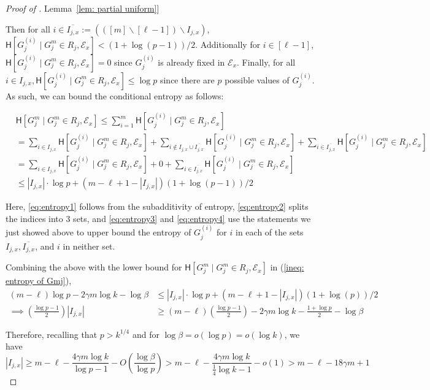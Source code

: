 \documentclass[11pt]{article}
\numberwithin{equation}{section}
\theoremstyle{definition}
\theoremstyle{plain}
\newcommand{\expref}[2]{\hyperref[#2]{#1~\ref{#2}}}
\newcommand{\cond}{\;|\;}
\newcommand{\bigo}[1]{\ensuremath{{{O} \left( {#1} \right)}}}
\newcommand{\littleo}[1]{\ensuremath{{o \left( {#1} \right)}}}
\newcommand{\eqdef}{\ensuremath{:=}}
\newcommand{\entropy}{\ensuremath{\mathsf{H}}}
\newcommand{\event}{\ensuremath{\mathcal{E}}}
\begin{document}
\begin{proof}[Proof of \expref{Lemma}{lem: partial uniform}]
		
		Then for all $i\in \overline{I_{j,x}}\eqdef \left(([m]\backslash[\ell-1]) \backslash I_{j,x}\right)$, $\entropy[G_j^{(i)}\cond G_j^m\in R_j,\event_x ] < (1+\log(p-1))/2$. Additionally for $i\in [\ell-1]$, $\entropy[G_j^{(i)}\cond G_j^m\in R_j,\event_x ]=0$ since $G_j^{(i)}$ is already fixed in $\event_x$. {\color{black} Finally, for all $i \in I_{j,x}, \entropy[G_j^{(i)}\cond G_j^m\in R_j,\event_x ] \le \log p$ since there are $p$ possible values of $G_j^{(i)}$.} As such, we can bound the conditional entropy as follows:

		\begin{align}
			\label{eq:entropy1}&\entropy\left[ G^m_j \cond G^m_j\in R_j,\event_x \right]
			\le  \sum_{i=1}^{m} \entropy[G_j^{(i)}\cond G_j^m\in R_j,\event_x ]\\
			\label{eq:entropy2}&=  \sum_{i\in I_{j,x} } \entropy[G_j^{(i)}\cond G_j^m\in R_j,\event_x ] + \sum_{i \notin I_{j,x} \cup \overline{I_{j,x}}} \entropy[G_j^{(i)}\cond G_j^m\in R_j,\event_x ] + \sum_{i\in \overline{I_{j,x}}} \entropy[G_j^{(i)}\cond G_j^m\in R_j,\event_x ] \\
			\label{eq:entropy3}&= \sum_{i\in I_{j,x} } \entropy[G_j^{(i)}\cond G_j^m\in R_j,\event_x ] + 0 + \sum_{i\in \overline{I_{j,x}}} \entropy[G_j^{(i)}\cond G_j^m\in R_j,\event_x ] \\
			\label{eq:entropy4}&\le  |I_{j,x}| \cdot \log p + (m-\ell+1 - |I_{j,x}|)(1+\log(p-1))/2
		\end{align}
		
%
{\color{black}Here, \eqref{eq:entropy1} %
%
%
follows from
the  %
subadditivity of entropy, \eqref{eq:entropy2} splits the indices into 3 sets, and \eqref{eq:entropy3} and \eqref{eq:entropy4} use the statements we just showed above to upper bound the entropy of $G_j^{(i)}$ for $i$ in %
%
each of the %
sets $I_{j,x}, \overline{I_{j,x}}$, and $i$ in neither set.}
		
Combining the above with  the lower bound for $\entropy\left[ G^m_j \cond G^m_j\in R_j,\event_x \right]$ in (\ref{ineq: entropy of Gmj}), 
		\begin{align*}
			 (m-\ell)\log p - 2\gamma m\log k - \log \beta & \le |I_{j,x}| \cdot \log p + (m-\ell+1 - |I_{j,x}|)(1+\log(p))/2\\
			\implies \left( \frac{\log p -1}{2} \right) |I_{j,x}| & \ge  (m-\ell)\left(\frac{\log p -1}{2}\right)-2\gamma m\log k -\frac{1+\log p}{2} -\log \beta
		\end{align*}

		Therefore, recalling that $p> k^{1/4}$ 
		{and for $\log \beta =o(\log p)=o(\log k)$}, we have
		\[|I_{j,x}| \ge  m-\ell -\frac{4\gamma m \log k}{\log p-1} - \bigo{\frac{\log \beta}{\log p}}>m-\ell -\frac{4\gamma m \log k}{\frac{1}{4}\log k-1} - \littleo{1} >m-\ell - 18\gamma m + 1 \]
		

\end{proof}
\end{document}
